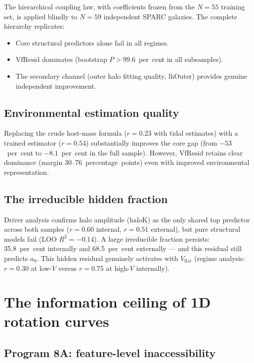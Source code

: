 \documentclass[fleqn,usenatbib]{mnras}
\newcommand{\vflat}{V_\mathrm{flat}}
\newcommand{\azero}{a_0}
\newcommand{\vfresid}{\mathrm{VfResid}}
\begin{document}
The hierarchical coupling law, with coefficients frozen from the $N = 55$ training set, is applied blindly to $N = 59$ independent SPARC galaxies.
The complete hierarchy replicates:
\begin{itemize}
\item Core structural predictors alone fail in all regimes.
\item $\vfresid$ dominates (bootstrap $P > 99.6$~per~cent in all subsamples).
\item The secondary channel (outer halo fitting quality, $\mathrm{lhOuter}$) provides genuine independent improvement.
\end{itemize}

\subsection{Environmental estimation quality}

Replacing the crude host-mass formula ($r = 0.23$ with tidal estimates) with a trained estimator ($r = 0.54$) substantially improves the core gap (from $-53$~per~cent to $-8.1$~per~cent in the full sample).
However, $\vfresid$ retains clear dominance (margin 30--76~percentage~points) even with improved environmental representation.

\subsection{The irreducible hidden fraction}

Driver analysis confirms halo amplitude ($\mathrm{haloK}$) as the only shared top predictor across both samples ($r = 0.60$ internal, $r = 0.51$ external), but pure structural models fail (LOO $R^2 = -0.14$).
A large irreducible fraction persists: 35.8~per~cent internally and 68.5~per~cent externally --- and this residual still predicts $\azero$.
This hidden residual genuinely activates with $\vflat$ (regime analysis: $r = 0.30$ at low-$V$ versus $r = 0.75$ at high-$V$ internally).


\section{The information ceiling of 1D rotation curves}
\label{sec:1Dceiling}

\subsection{Program 8A: feature-level inaccessibility}
\end{document}
